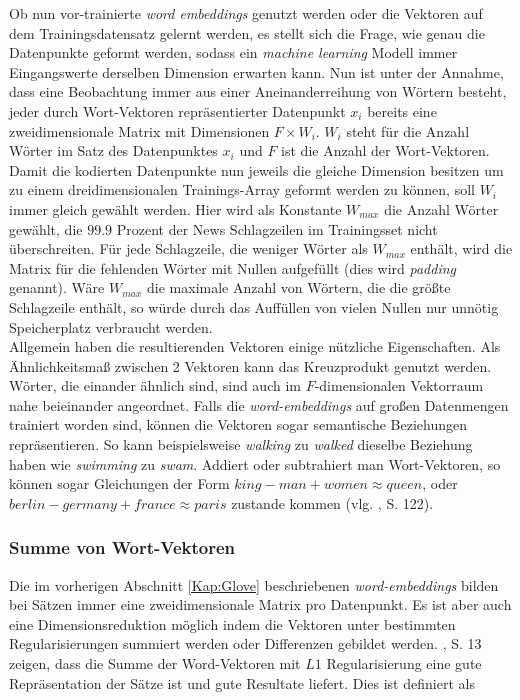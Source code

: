 \documentclass[a4paper,11pt]{article}
\begin{document}
Ob nun vor-trainierte \textit{word embeddings} genutzt werden oder die Vektoren auf dem Trainingsdatensatz gelernt werden, es stellt sich die Frage, wie genau die Datenpunkte geformt werden, sodass ein \textit{machine learning} Modell immer Eingangswerte derselben Dimension erwarten kann. Nun ist unter der Annahme, dass eine Beobachtung immer aus einer Aneinanderreihung von Wörtern besteht, jeder durch Wort-Vektoren repräsentierter Datenpunkt $x_i$ bereits eine zweidimensionale Matrix mit Dimensionen $F \times  W_i$. $W_i$ steht für die Anzahl Wörter im Satz des Datenpunktes $x_i$ und $F$ ist die Anzahl der Wort-Vektoren. Damit die kodierten Datenpunkte nun jeweils die gleiche Dimension besitzen um zu einem dreidimensionalen Trainings-Array geformt werden zu können, soll $W_i$ immer gleich gewählt werden. Hier wird als Konstante $W_{max}$ die Anzahl Wörter gewählt, die $99.9$ Prozent der News Schlagzeilen im Trainingsset nicht überschreiten. Für jede Schlagzeile, die weniger Wörter als $W_{max}$ enthält, wird die Matrix für die fehlenden Wörter mit Nullen aufgefüllt (dies wird \textit{padding} genannt). Wäre $W_{max}$ die maximale Anzahl von Wörtern, die die größte Schlagzeile enthält, so würde durch das Auffüllen von vielen Nullen nur unnötig Speicherplatz verbraucht werden. \\

Allgemein haben die resultierenden Vektoren einige nützliche Eigenschaften. Als Ähnlichkeitsmaß zwischen 2 Vektoren kann das Kreuzprodukt genutzt werden. Wörter, die einander ähnlich sind, sind auch im $F$-dimensionalen Vektorraum nahe beieinander angeordnet. Falls die \textit{word-embeddings} auf großen Datenmengen trainiert worden sind, können die Vektoren sogar semantische Beziehungen repräsentieren. So kann beispielsweise \textit{walking} zu \textit{walked} dieselbe Beziehung haben wie \textit{swimming} zu \textit{swam}. Addiert oder subtrahiert man Wort-Vektoren, so können sogar Gleichungen der Form $king - man + women \approx queen$, oder $berlin - germany + france \approx paris$ zustande kommen (vlg. \cite{deepEssentials}, S. 122).

\subsubsection{Summe von Wort-Vektoren}

Die im vorherigen Abschnitt \ref{Kap:Glove} beschriebenen \textit{word-embeddings} bilden bei Sätzen immer eine zweidimensionale Matrix pro Datenpunkt. Es ist aber auch eine Dimensionsreduktion möglich indem die Vektoren unter bestimmten Regularisierungen summiert werden oder Differenzen gebildet werden. \cite{sumsWords}, S. 13 zeigen, dass die Summe der Word-Vektoren mit $L1$ Regularisierung eine gute Repräsentation der Sätze ist und gute Resultate liefert. Dies ist definiert als
\end{document}
